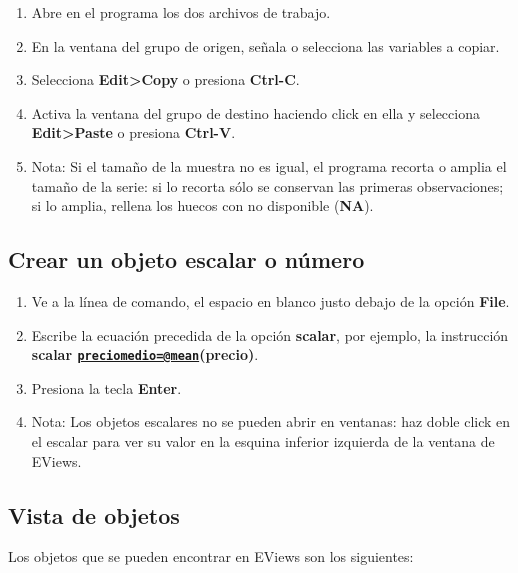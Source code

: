 \documentclass[
]{book}
\providecommand{\tightlist}{%
  \setlength{\itemsep}{0pt}\setlength{\parskip}{0pt}}
\begin{document}
\begin{enumerate}
\def\labelenumi{\arabic{enumi}.}
\tightlist
\item
  Abre en el programa los dos archivos de trabajo.
\item
  En la ventana del grupo de origen, señala o selecciona las variables a copiar.
\item
  Selecciona \textbf{Edit\textgreater Copy} o presiona \textbf{Ctrl-C}.
\item
  Activa la ventana del grupo de destino haciendo click en ella y selecciona \textbf{Edit\textgreater Paste} o presiona \textbf{Ctrl-V}.
\item
  Nota: Si el tamaño de la muestra no es igual, el programa recorta o amplia el tamaño de la serie: si lo recorta sólo se conservan las primeras observaciones; si lo amplia, rellena los huecos con no disponible (\textbf{NA}).
\end{enumerate}

\hypertarget{crear-un-objeto-escalar-o-nuxfamero}{%
\subsection{Crear un objeto escalar o número}\label{crear-un-objeto-escalar-o-nuxfamero}}

\begin{enumerate}
\def\labelenumi{\arabic{enumi}.}
\tightlist
\item
  Ve a la línea de comando, el espacio en blanco justo debajo de la opción \textbf{File}.
\item
  Escribe la ecuación precedida de la opción \textbf{scalar}, por ejemplo, la instrucción \textbf{scalar \href{mailto:preciomedio=@mean}{\nolinkurl{preciomedio=@mean}}(precio)}.
\item
  Presiona la tecla \textbf{Enter}.
\item
  Nota: Los objetos escalares no se pueden abrir en ventanas: haz doble click en el escalar para ver su valor en la esquina inferior izquierda de la ventana de EViews.
\end{enumerate}

\hypertarget{vista-de-objetos}{%
\subsection{Vista de objetos}\label{vista-de-objetos}}

Los objetos que se pueden encontrar en EViews son los siguientes:
\end{document}
